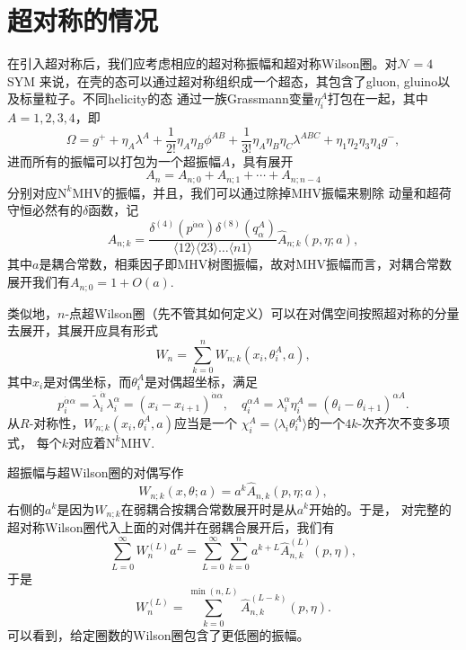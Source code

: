 \documentclass[10pt]{article}
\begin{document}
\section{超对称的情况}

在引入超对称后，我们应考虑相应的超对称振幅和超对称Wilson圈。对$\mathcal N=4$ SYM
来说，在壳的态可以通过超对称组织成一个超态，其包含了gluon, gluino以及标量粒子。不同helicity的态
通过一族Grassmann变量$\eta_i^A$打包在一起，其中$A=1,2,3,4$，即
\[
	\Omega=g^{+}+\eta_A \lambda^A+\frac{1}{2 !} \eta_A \eta_B \phi^{A B}+\frac{1}{3 !} \eta_A \eta_B \eta_C \lambda^{A B C}+\eta_1 \eta_2 \eta_3 \eta_4 g^{-},
\]
进而所有的振幅可以打包为一个超振幅$A$，具有展开
\[
	A_n=A_{n;0}+A_{n;1}+\cdots+A_{n;n-4}
\]
分别对应$\text{N}^k\text{MHV}$的振幅，并且，我们可以通过除掉MHV振幅来剔除
动量和超荷守恒必然有的$\delta$函数，记
\[
	A_{n;k}=\frac{\delta^{(4)}(p^{\dot{\alpha} \alpha}) \delta^{(8)}(q_\alpha^A)}{\langle 12\rangle\langle 23\rangle \ldots\langle n 1\rangle} \widehat{A}_{n ; k}(p, \eta ; a),
\]
其中$a$是耦合常数，相乘因子即MHV树图振幅，故对MHV振幅而言，对耦合常数展开我们有$A_{n;0}=1+O(a)$.


类似地，$n$-点超Wilson圈（先不管其如何定义）可以在对偶空间按照超对称的分量去展开，其展开应具有形式
\[
	W_n=\sum_{k=0}^n W_{n;k}(x_i,\theta_i^A,a),
\]
其中$x_i$是对偶坐标，而$\theta_i^A$是对偶超坐标，满足
\[
p_i^{\dot{\alpha} \alpha}=\widetilde{\lambda}_i^{\dot{\alpha}} \lambda_i^\alpha=\left(x_i-x_{i+1}\right)^{\dot{\alpha} \alpha}, \quad q_i^{\alpha A}=\lambda_i^\alpha \eta_i^A=\left(\theta_i-\theta_{i+1}\right)^{\alpha A}.
\]
从$R$-对称性，$W_{n;k}(x_i,\theta_i^A,a)$应当是一个
$\chi_i^A=\langle \lambda_i\theta_i^A\rangle$的一个$4k$-次齐次不变多项式，
每个$k$对应着$\text{N}^k\text{MHV}$.

超振幅与超Wilson圈的对偶写作
\[
	W_{n;k}(x,\theta;a)=a^k \widehat A_{n,k}(p,\eta;a),
\]
右侧的$a^k$是因为$W_{n;k}$在弱耦合按耦合常数展开时是从$a^k$开始的。于是，
对完整的超对称Wilson圈代入上面的对偶并在弱耦合展开后，我们有
\[
	\sum_{L=0}^\infty W_n^{(L)}a^L=\sum_{L=0}^\infty\sum_{k=0}^n a^{k+L}\widehat A_{n,k}^{(L)}(p,\eta),
\]
于是
\[
	W_n^{(L)}=\sum_{k=0}^{\min(n,L)} \widehat A_{n,k}^{(L-k)}(p,\eta).
\]
可以看到，给定圈数的Wilson圈包含了更低圈的振幅。
\end{document}
